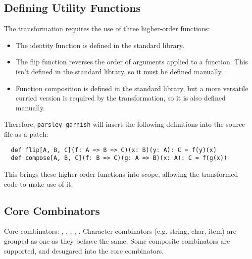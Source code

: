 \documentclass[../../main.tex]{subfiles}
\begin{document}
\subsection{Defining Utility Functions}
The transformation requires the use of three higher-order functions:
\begin{itemize}
  \item The identity function  is defined in the standard library.
  \item The flip function reverses the order of arguments applied to a function. This isn't defined in the standard library, so it must be defined manually.
  \item Function composition is defined in the standard library, but a more versatile curried version is required by the transformation, so it is also defined manually.
\end{itemize}
%
Therefore, \texttt{parsley-garnish} will insert the following definitions into the source file as a patch:
\begin{verbatim}
  def flip[A, B, C](f: A => B => C)(x: B)(y: A): C = f(y)(x)
  def compose[A, B, C](f: B => C)(g: A => B)(x: A): C = f(g(x))
\end{verbatim}
%
This brings these higher-order functions into scope, allowing the transformed code to make use of it.

\subsection{Core Combinators}
Core combinators: , , , \scala{<*>}, \scala{<|>}.
Character combinators (e.g. string, char, item) are grouped as one as they behave the same.
Some composite combinators are supported, and desugared into the core combinators.

\end{document}
